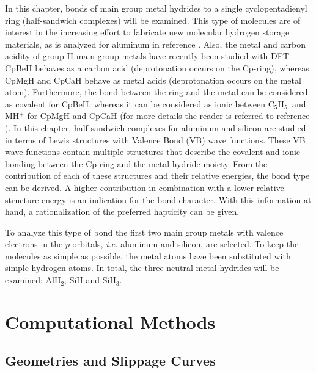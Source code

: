 In this chapter, bonds of main group metal hydrides to a single cyclopentadienyl ring (half-sandwich complexes) will be examined. This type of molecules are of interest in the increasing effort to fabricate new molecular hydrogen storage materials, as is analyzed for aluminum in reference \cite{himmel}. Also, the metal and carbon acidity of group II main group metals have recently been studied with DFT \cite{hurtado}. CpBeH behaves as a carbon acid (deprotonation occurs on the Cp-ring), whereas CpMgH and CpCaH behave as metal acids (deprotonation occurs on the metal atom). Furthermore, the bond between the ring and the metal can be considered as covalent for CpBeH, whereas it can be considered as ionic between C$_5$H$_5^{-}$ and MH$^{+}$ for CpMgH and CpCaH (for more details the reader is referred to reference \cite{hurtado}). In this chapter, half-sandwich complexes for aluminum and silicon are studied in terms of Lewis structures with Valence Bond (VB) wave functions. These VB wave functions contain multiple structures that describe the covalent and ionic bonding between the Cp-ring and the metal hydride moiety. From the contribution of each of these structures and their relative energies, the bond type can be derived. A higher contribution in combination with a lower relative structure energy is an indication for the bond character. With this information at hand, a rationalization of the preferred hapticity can be given. 

To analyze this type of bond the first two main group metals with valence electrons in the $p$ orbitals, \textit{i.e.} aluminum and silicon, are selected. To keep the molecules as simple as possible, the metal atoms have been substituted with simple hydrogen atoms. In total, the three neutral metal hydrides will be examined: AlH$_2$, SiH and SiH$_3$.

\section{Computational Methods}

\subsection{\label{ch4.sec.geom}Geometries and Slippage Curves}

